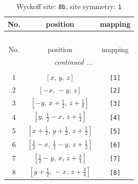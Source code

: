 \documentclass[fleqn,8pt]{jsarticle}
\begin{document}
\begin{longtable}{ccc}
\caption{Wyckoff site: {\tt 8b}, site symmetry: {\tt 1}}
 \\
 \hline \hline
No. & position & mapping \\ \hline \endfirsthead

\multicolumn{2}{l}{\tablename\ \thetable{}} \\
 \hline \hline
No. & position & mapping \\ \hline \endhead

 \hline \hline
\multicolumn{2}{r}{\footnotesize\it continued ...} \\ \endfoot

 \hline \hline
\multicolumn{2}{r}{} \\ \endlastfoot

1 & $\left[ x,\, y,\, z \right]$ & {\tt [1]} \\ \hline
2 & $\left[ - x,\, - y,\, z \right]$ & {\tt [2]} \\ \hline
3 & $\left[ - y,\, x + \frac{1}{2},\, z + \frac{1}{4} \right]$ & {\tt [3]} \\ \hline
4 & $\left[ y,\, \frac{1}{2} - x,\, z + \frac{1}{4} \right]$ & {\tt [4]} \\ \hline
5 & $\left[ x + \frac{1}{2},\, y + \frac{1}{2},\, z + \frac{1}{2} \right]$ & {\tt [5]} \\ \hline
6 & $\left[ \frac{1}{2} - x,\, \frac{1}{2} - y,\, z + \frac{1}{2} \right]$ & {\tt [6]} \\ \hline
7 & $\left[ \frac{1}{2} - y,\, x,\, z + \frac{3}{4} \right]$ & {\tt [7]} \\ \hline
8 & $\left[ y + \frac{1}{2},\, - x,\, z + \frac{3}{4} \right]$ & {\tt [8]} \\
\end{longtable}
\end{document}
